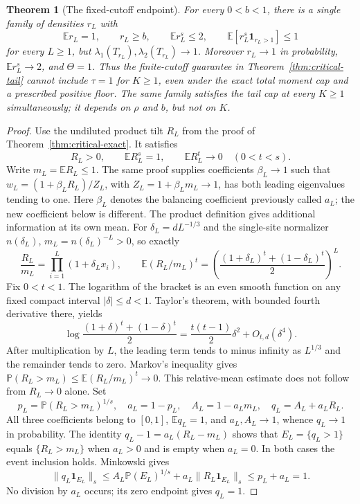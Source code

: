 \documentclass[11pt]{article}
\newtheorem{theorem}{Theorem}
\begin{document}
\begin{theorem}[The fixed-cutoff endpoint]\label{thm:finite-tail-endpoint}
For every $0<b<1$, there is a single family of densities $r_L$ with
\[
 \mathbb E r_L=1,\qquad r_L\ge b,\qquad \mathbb E r_L^s\le2,
 \qquad \mathbb E[r_L^s\mathbf1_{r_L>1}]\le1
\]
for every $L\ge1$, but $\lambda_1(T_{r_L}),\lambda_2(T_{r_L})\to1$.
Moreover $r_L\to1$ in probability, $\mathbb E r_L^s\to2$, and
$\Theta=1$. Thus the finite-cutoff guarantee in
Theorem~\ref{thm:critical-tail} cannot include $\tau=1$ for $K\ge1$,
even under the exact total moment cap and a prescribed positive floor.
The same family satisfies the tail cap at every $K\ge1$ simultaneously;
it depends on $\rho$ and $b$, but not on $K$.
\end{theorem}
\begin{proof}
Use the undiluted product tilt $R_L$ from the proof of
Theorem~\ref{thm:critical-exact}. It satisfies
\[
 R_L>0,\qquad \mathbb E R_L^s=1,\qquad
 \mathbb E R_L^t\longrightarrow0\quad(0<t<s).
\]
Write $m_L=\mathbb E R_L\le1$. The same proof supplies coefficients
$\beta_L\to1$ such that $w_L=(1+\beta_LR_L)/Z_L$, with
$Z_L=1+\beta_Lm_L\to1$, has both leading eigenvalues tending to one.
Here $\beta_L$ denotes the balancing coefficient previously called
$a_L$; the new coefficient below is different.
The product definition gives additional information at its own mean.
For $\delta_L=dL^{-1/3}$ and the single-site normalizer $n(\delta_L)$,
$m_L=n(\delta_L)^{-L}>0$, so exactly
\[
 \frac{R_L}{m_L}=\prod_{i=1}^L(1+\delta_L x_i),\qquad
 \mathbb E(R_L/m_L)^t=
 \left(\frac{(1+\delta_L)^t+(1-\delta_L)^t}{2}\right)^L.
\]
Fix $0<t<1$. The logarithm of the bracket is an even smooth function
on any fixed compact interval $|\delta|\le d<1$. Taylor's theorem,
with bounded fourth derivative there, yields
\[
 \log\frac{(1+\delta)^t+(1-\delta)^t}{2}
 =\frac{t(t-1)}2\delta^2+O_{t,d}(\delta^4).
\]
After multiplication by $L$, the leading term tends to minus infinity
as $L^{1/3}$ and the remainder tends to zero. Markov's inequality gives
$\mathbb P(R_L>m_L)\le\mathbb E(R_L/m_L)^t\to0$.
This relative-mean estimate does not follow from $R_L\to0$ alone.
Set
\[
 p_L=\mathbb P(R_L>m_L)^{1/s},\quad a_L=1-p_L,\quad
 A_L=1-a_Lm_L,\quad q_L=A_L+a_LR_L.
\]
All three coefficients belong to $[0,1]$, $\mathbb E q_L=1$, and
$a_L,A_L\to1$, whence $q_L\to1$ in probability. The identity
$q_L-1=a_L(R_L-m_L)$ shows that $E_L=\{q_L>1\}$ equals
$\{R_L>m_L\}$ when $a_L>0$ and is empty when $a_L=0$.
In both cases the event inclusion holds. Minkowski gives
\[
 \|q_L\mathbf1_{E_L}\|_s
 \le A_L\mathbb P(E_L)^{1/s}+a_L\|R_L\mathbf1_{E_L}\|_s
 \le p_L+a_L=1.
\]
No division by $a_L$ occurs; its zero endpoint gives $q_L=1$.


\end{proof}
\end{document}
